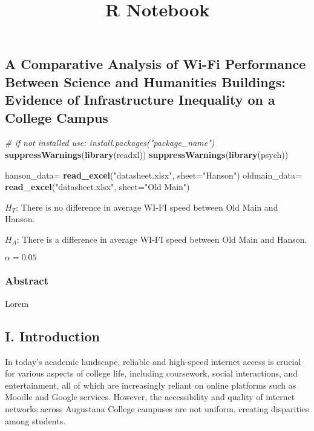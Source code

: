 \documentclass[
]{article}
\title{R Notebook}
\author{}
\date{\vspace{-2.5em}}
\newenvironment{Shaded}{\begin{snugshade}}{\end{snugshade}}
\newcommand{\AttributeTok}[1]{\textcolor[rgb]{0.13,0.29,0.53}{#1}}
\newcommand{\CommentTok}[1]{\textcolor[rgb]{0.56,0.35,0.01}{\textit{#1}}}
\newcommand{\FunctionTok}[1]{\textcolor[rgb]{0.13,0.29,0.53}{\textbf{#1}}}
\newcommand{\NormalTok}[1]{#1}
\newcommand{\OtherTok}[1]{\textcolor[rgb]{0.56,0.35,0.01}{#1}}
\newcommand{\StringTok}[1]{\textcolor[rgb]{0.31,0.60,0.02}{#1}}
\begin{document}
\maketitle

\subsection{A Comparative Analysis of Wi-Fi Performance Between Science
and Humanities Buildings: Evidence of Infrastructure Inequality on a
College
Campus}\label{a-comparative-analysis-of-wi-fi-performance-between-science-and-humanities-buildings-evidence-of-infrastructure-inequality-on-a-college-campus}

\begin{Shaded}
\begin{Highlighting}[]
\CommentTok{\# if not installed use: install.packages("package\_name")}
\FunctionTok{suppressWarnings}\NormalTok{(}\FunctionTok{library}\NormalTok{(readxl))}
\FunctionTok{suppressWarnings}\NormalTok{(}\FunctionTok{library}\NormalTok{(psych))}

\NormalTok{hanson\_data}\OtherTok{=} \FunctionTok{read\_excel}\NormalTok{(}\StringTok{"datasheet.xlsx"}\NormalTok{, }\AttributeTok{sheet=}\StringTok{"Hanson"}\NormalTok{)}
\NormalTok{oldmain\_data}\OtherTok{=} \FunctionTok{read\_excel}\NormalTok{(}\StringTok{"datasheet.xlsx"}\NormalTok{, }\AttributeTok{sheet=}\StringTok{"Old Main"}\NormalTok{)}
\end{Highlighting}
\end{Shaded}

\(H_T\): There is no difference in average WI-FI speed between Old Main
and Hanson.

\(H_A\): There is a difference in average WI-FI speed between Old Main
and Hanson.

\(\alpha=0.05\)

\subsubsection{Abstract}\label{abstract}

Lorem

\subsection{I. Introduction}\label{i.-introduction}

In today's academic landscape, reliable and high-speed internet access
is crucial for various aspects of college life, including coursework,
social interactions, and entertainment, all of which are increasingly
reliant on online platforms such as Moodle and Google services. However,
the accessibility and quality of internet networks across Augustana
College campuses are not uniform, creating disparities among students.
\end{document}
